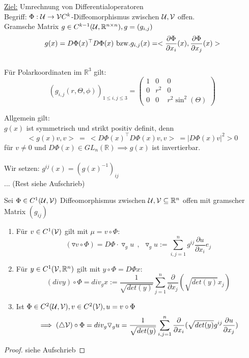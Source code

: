   \begin{remark}
    \underline{Ziel:} Umrechnung von Differentialoperatoren\\
    Begriff: $\Phi: \mathcal{U} \to \mathcal{V} C^k$-Diffeomorphismus zwischen $\mathcal{U}, \mathcal{V}$ offen.\\
    Gramsche Matrix $g \in C^{k-1}(\mathcal{U}, \mathbb{R}^{n\times n}), g = (g_{i,j})$
    $$g(x) = D\Phi(x)^{\top} D\Phi(x) \text{ bzw.}\\
    g_{i,j}(x) = <\frac{\partial\Phi}{\partial x_i}(x), \frac{\partial\Phi}{\partial x_j}(x)>$$\\
    Für Polarkoordinaten im $\mathbb{R}^3$ gilt:
    $$(g_{i,j}(r, \Theta, \phi))_{1\leq i,j \leq 3} = \left(\begin{array}{ccc}
      1 & 0 & 0 \\
      0 & r^2 & 0 \\
      0 & 0 & r^2 \sin^2(\Theta)      
    \end{array}\right)$$
    
    \newpage

    Allgemein gilt:\\
    $g(x)$ ist symmetrisch und strikt positiv definit, denn
    $$<g(x)v,v> \ = \ <D\Phi(x)^{\top}D\Phi(x) v, v> \ = |D\Phi(x) v|^2 > 0$$
    für $v\neq 0$ und $D\Phi(x) \in GL_n(\mathbb{R}) \implies g(x)$ ist invertierbar.\\
    \\
    Wir setzen: $g^{ij}(x) = (g(x)^{-1})_{ij}$\\
    ... (Rest siehe Aufschrieb)
  \end{remark}

  \begin{theorem}
    Sei $\Phi \in C^1(\mathcal{U}, \mathcal{V})$ Diffeomorphismus zwischen $\mathcal{U}, \mathcal{V} \subseteq \mathbb{R}^n$ offen mit gramscher Matrix $(g_{ij})$
    \begin{enumerate}
      \item Für $v \in C^1(\mathcal{V})$ gilt mit $\mu = v \circ \Phi$:
      $$(\triangledown v \circ \Phi) = D\Phi \cdot \triangledown_g u \ \ , \ \ \triangledown_g u := \sum\limits_{i,j=1}^n g^{ij} \frac{\partial u}{\partial x_i} e_j$$
      \item Für $y \in C^1(\mathcal{V}, \mathbb{R}^n)$ gilt mit $y \circ \Phi = D\Phi x$:
        $$(div y) \circ \Phi = div_g x := \frac{1}{\sqrt{det(y)}} \sum\limits_{j=1}^n \frac{\partial}{\partial x_j} (\sqrt{det(y)} x_j)$$
      \item Ist $\Phi \in C^2(\mathcal{U}, \mathcal{V}), v \in C^2(\mathcal{V}), u = v \circ \Phi$
        $$\implies (\triangle \mathcal{V}) \circ \Phi = div_g \triangledown_g u = \frac{1}{\sqrt{det(y)}} \sum\limits_{i,j=1}^n \frac{\partial}{\partial x_i} (\sqrt{det(y)} g^{ij} \frac{\partial u}{\partial x_j})$$
    \end{enumerate}
  \end{theorem}
  \begin{proof}
    siehe Aufschrieb
  \end{proof}

